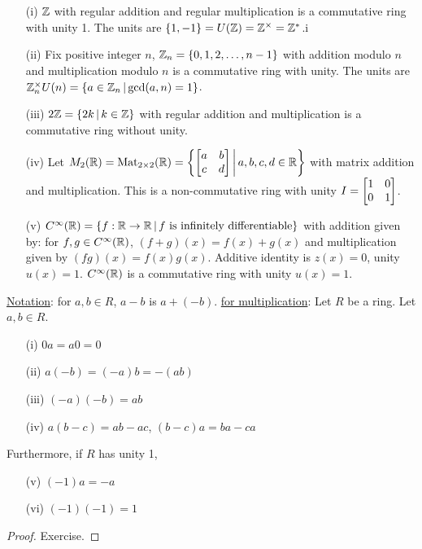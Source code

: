 \documentclass[]{article}
\begin{document}
\begin{example}
	\begin{itemize}
		\item[(i)] $\mathbb{Z}$ with regular addition and regular multiplication is a commutative ring with unity 1.
			The units are $\left\{ 1,-1 \right\} = U(\mathbb{Z}) = \mathbb{Z}^\times = \mathbb{Z}^*$.i
		\item[(ii)] Fix positive integer $n$, $\mathbb{Z}_n=\left\{ 0,1,2,\dots,n-1 \right\}$ with addition modulo $n$ and multiplication modulo $n$ is a commutative ring with unity.
			The units are $\mathbb{Z}_n^\times U(n) = \left\{ a\in\mathbb{Z}_n \, \middle| \, \gcd(a,n)=1 \right\}$.
		\item[(iii)] $2\mathbb{Z}=\left\{ 2k \, \middle| \, k\in\mathbb{Z} \right\}$ with regular addition and multiplication is a commutative ring without unity.
		\item[(iv)] Let $M_2(\mathbb{R})=\text{Mat}_{2\times2}(\mathbb{R}) = \left\{ \begin{bmatrix}a&b\\c&d\end{bmatrix} \, \middle| \, a,b,c,d\in\mathbb{R} \right\}$ with matrix addition and multiplication.
			This is a non-commutative ring with unity $I=\begin{bmatrix}1&0\\0&1\end{bmatrix}$.
		\item[(v)] $C^\infty(\mathbb{R}) = \left\{ f:\mathbb{R}\rightarrow\mathbb{R} \, \middle| \, f\text{ is infinitely differentiable} \right\}$ with addition given by: for $f,g\in C^\infty(\mathbb{R})$, $(f+g)(x) = f(x)+g(x)$ and multiplication given by  $(fg)(x) = f(x)g(x)$.
			Additive identity is $z(x)=0$, unity $u(x)=1$. $C^\infty(\mathbb{R})$ is a commutative ring with unity $u(x)=1$.
	\end{itemize}
\end{example}

\ul{Notation}: for $a,b\in R$, $a-b$ is $a+(-b)$.
\ul{ for multiplication}: Let $R$ be a ring. Let $a,b\in R$.
\begin{itemize}
	\item[(i)] $0a=a0=0$
	\item[(ii)] $a(-b)=(-a)b = -(ab)$
	\item[(iii)] $(-a)(-b) = ab$
	\item[(iv)] $a(b-c)=ab-ac$, $(b-c)a=ba-ca$
\end{itemize}
Furthermore, if $R$ has unity 1,
\begin{itemize}
	\item[(v)] $(-1)a=-a$
	\item[(vi)] $(-1)(-1)=1$
\end{itemize}
\begin{proof}
	Exercise.
\end{proof}
\end{document}
